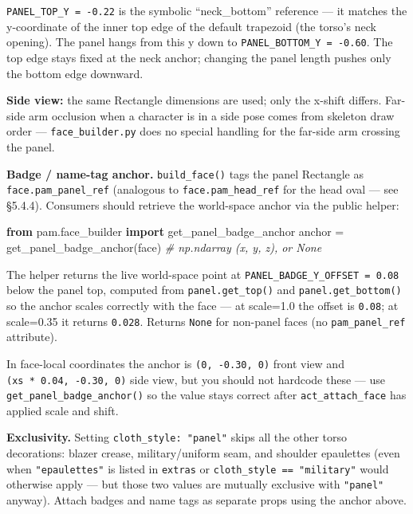 \documentclass[
  12pt,
  letterpaper,
]{book}
\newenvironment{Shaded}{}{}
\newcommand{\CommentTok}[1]{\textcolor[rgb]{0.38,0.63,0.69}{\textit{#1}}}
\newcommand{\ImportTok}[1]{\textcolor[rgb]{0.00,0.50,0.00}{\textbf{#1}}}
\newcommand{\NormalTok}[1]{#1}
\newcommand{\OperatorTok}[1]{\textcolor[rgb]{0.40,0.40,0.40}{#1}}
\begin{document}
\texttt{PANEL\_TOP\_Y\ =\ -0.22} is the symbolic ``neck\_bottom''
reference --- it matches the y-coordinate of the inner top edge of the
default trapezoid (the torso's neck opening). The panel hangs from this
y down to \texttt{PANEL\_BOTTOM\_Y\ =\ -0.60}. The top edge stays fixed
at the neck anchor; changing the panel length pushes only the bottom
edge downward.

\textbf{Side view:} the same Rectangle dimensions are used; only the
x-shift differs. Far-side arm occlusion when a character is in a side
pose comes from skeleton draw order --- \texttt{face\_builder.py} does
no special handling for the far-side arm crossing the panel.

\textbf{Badge / name-tag anchor.} \texttt{build\_face()} tags the panel
Rectangle as \texttt{face.pam\_panel\_ref} (analogous to
\texttt{face.pam\_head\_ref} for the head oval --- see §5.4.4).
Consumers should retrieve the world-space anchor via the public helper:

\begin{Shaded}
\begin{Highlighting}[]
\ImportTok{from}\NormalTok{ pam.face\_builder }\ImportTok{import}\NormalTok{ get\_panel\_badge\_anchor}
\NormalTok{anchor }\OperatorTok{=}\NormalTok{ get\_panel\_badge\_anchor(face)   }\CommentTok{\# np.ndarray (x, y, z), or None}
\end{Highlighting}
\end{Shaded}

The helper returns the live world-space point at
\texttt{PANEL\_BADGE\_Y\_OFFSET\ =\ 0.08} below the panel top, computed
from \texttt{panel.get\_top()} and \texttt{panel.get\_bottom()} so the
anchor scales correctly with the face --- at scale=1.0 the offset is
\texttt{0.08}; at scale=0.35 it returns \texttt{0.028}. Returns
\texttt{None} for non-panel faces (no \texttt{pam\_panel\_ref}
attribute).

In face-local coordinates the anchor is \texttt{(0,\ -0.30,\ 0)} front
view and \texttt{(xs\ *\ 0.04,\ -0.30,\ 0)} side view, but you should
not hardcode these --- use \texttt{get\_panel\_badge\_anchor()} so the
value stays correct after \texttt{act\_attach\_face} has applied scale
and shift.

\textbf{Exclusivity.} Setting \texttt{cloth\_style:\ "panel"} skips all
the other torso decorations: blazer crease, military/uniform seam, and
shoulder epaulettes (even when \texttt{"epaulettes"} is listed in
\texttt{extras} or \texttt{cloth\_style\ ==\ "military"} would otherwise
apply --- but those two values are mutually exclusive with
\texttt{"panel"} anyway). Attach badges and name tags as separate props
using the anchor above.
\end{document}
